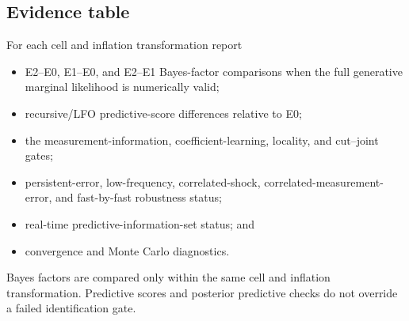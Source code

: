 \documentclass[11pt]{article}
\begin{document}
\subsection{Evidence table}
For each cell and inflation transformation report
\begin{itemize}
\item E2--E0, E1--E0, and E2--E1 Bayes-factor comparisons when the full generative marginal likelihood is numerically valid;
\item recursive/LFO predictive-score differences relative to E0;
\item the measurement-information, coefficient-learning, locality, and cut--joint gates;
\item persistent-error, low-frequency, correlated-shock, correlated-measurement-error, and fast-by-fast robustness status;
\item real-time predictive-information-set status; and
\item convergence and Monte Carlo diagnostics.
\end{itemize}
Bayes factors are compared only within the same cell and inflation transformation. Predictive scores and posterior predictive checks do not override a failed identification gate.
\end{document}
